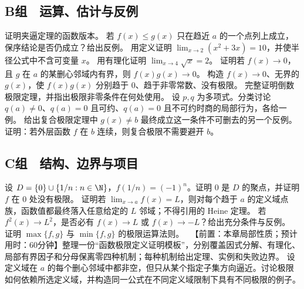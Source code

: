 \subsection*{B组　运算、估计与反例}
\begin{enumerate}[label=\textbf{14.\arabic*.},resume]
  \mustdo 证明夹逼定理的函数版本。
  \mustdo 若 \(f(x)\le g(x)\) 只在趋近 \(a\) 的一个点列上成立，保序结论是否仍成立？给出反例。
  \mustdo 用定义证明 \(\lim_{x\to2}(x^2+3x)=10\)，并使半径公式中不含可变量 \(x\)。
  \mustdo 用有理化证明 \(\lim_{x\to4}\sqrt x=2\)。
  \mustdo 证明若 \(f(x)\to0\)，且 \(g\) 在 \(a\) 的某删心邻域内有界，则 \(f(x)g(x)\to0\)。
  \mustdo 构造 \(f(x)\to0\)、无界的 \(g(x)\)，使 \(f(x)g(x)\) 分别趋于 \(0\)、趋于非零常数、没有极限。
  \mustdo 完整证明倒数极限定理，并指出极限非零条件在何处使用。
  \mustdo 设 \(p,q\) 为多项式。分类讨论 \(q(a)\ne0\)、\(q(a)=0\) 且可约、\(q(a)=0\) 且不可约时商的局部行为，各给一例。
  \mustdo 给出复合极限定理中 \(g(x)\ne b\) 最终成立这一条件不可删去的另一个反例。
  \mustdo 证明：若外层函数 \(f\) 在 \(b\) 连续，则复合极限不需要避开 \(b\)。
\end{enumerate}

\subsection*{C组　结构、边界与项目}
\begin{enumerate}[label=\textbf{14.\arabic*.},resume]
  \mustdo 设 \(D=\{0\}\cup\{1/n:n\in\N\}\)，\(f(1/n)=(-1)^n\)。证明 \(0\) 是 \(D\) 的聚点，并证明 \(f\) 在 \(0\) 处没有极限。
  \mustdo 证明若 \(\lim_{x\to a}f(x)=L\)，则对每个趋于 \(a\) 的定义域点族，函数值都最终落入任意给定的 \(L\) 邻域；不得引用的 Heine 定理。
  \optionaldo 若 \(f^2(x)\to L^2\)，是否必有 \(f(x)\to L\) 或 \(f(x)\to-L\)？给出充分条件与反例。
  \optionaldo 证明 \(\max\{f,g\}\) 与 \(\min\{f,g\}\) 的极限运算法则。
  \projectdo\ 【前置：本章局部性质；预计用时：60分钟】整理一份“函数极限定义证明模板”，分别覆盖因式分解、有理化、局部有界因子和分母保离零四种机制；每种机制给出定理、实例和失败边界。
  \opendo 设定义域在 \(a\) 的每个删心邻域中都非空，但只从某个指定子集方向逼近。讨论极限如何依赖所选定义域，并构造同一公式在不同定义域限制下具有不同极限的例子。
\end{enumerate}
